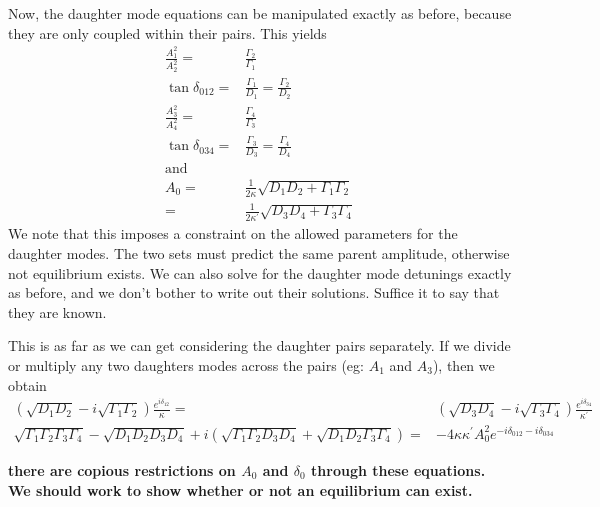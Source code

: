 Now, the daughter mode equations can be manipulated exactly as before, because they are only coupled within their pairs. This yields
\begin{subequations}
\begin{align}
\frac{A_1^2}{A_2^2} = & \frac{\Gamma_2}{\Gamma_1} \\
\tan\delta_{012} = & \frac{\Gamma_1}{D_1} = \frac{\Gamma_2}{D_2} \\
\frac{A_3^2}{A_4^2} = & \frac{\Gamma_4}{\Gamma_3} \\
\tan\delta_{034} = & \frac{\Gamma_3}{D_3} = \frac{\Gamma_4}{D_4} \\
\mathrm{and} & \\
A_0 = & \frac{1}{2\kappa}\sqrt{D_1 D_2 + \Gamma_1 \Gamma_2} \\
    = & \frac{1}{2\kappa^\prime}\sqrt{D_3 D_4 + \Gamma_3 \Gamma_4}
\end{align}
\end{subequations}
We note that this imposes a constraint on the allowed parameters for the daughter modes. The two sets must predict the same parent amplitude, otherwise not equilibrium exists. We can also solve for the daughter mode detunings exactly as before, and we don't bother to write out their solutions. Suffice it to say that they are known.

This is as far as we can get considering the daughter pairs separately. If we divide or multiply any two daughters modes across the pairs (eg: $A_1$ and $A_3$), then we obtain
\begin{subequations}
\begin{align}
\left(\sqrt{D_1 D_2} - i \sqrt{\Gamma_1 \Gamma_2} \right) \frac{e^{i\delta_{12}}}{\kappa} = & \left( \sqrt{D_3 D_4} -i \sqrt{\Gamma_3 \Gamma_4} \right) \frac{e^{i\delta_{34}}}{\kappa^\prime} \\
\sqrt{\Gamma_1 \Gamma_2 \Gamma_3 \Gamma_4} - \sqrt{D_1 D_2 D_3 D_4} + i \left( \sqrt{\Gamma_1 \Gamma_2 D_3 D_4} + \sqrt{D_1 D_2 \Gamma_3 \Gamma_4} \right) = & -4\kappa \kappa^\prime A_0^2 e^{-i\delta_{012} - i\delta_{034}}
\end{align}
\end{subequations}

\textbf{there are copious restrictions on $A_0$ and $\delta_0$ through these equations. We should work to show whether or not an equilibrium can exist.}


